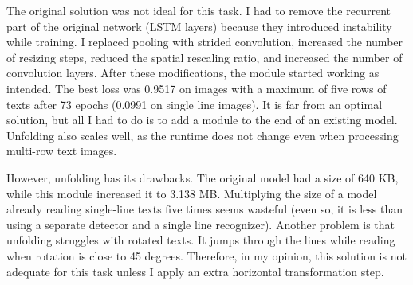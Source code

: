 The original solution was not ideal for this task. I had to remove the recurrent part of the original network (LSTM layers) because they introduced instability while training. I replaced pooling with strided convolution, increased the number of resizing steps, reduced the spatial rescaling ratio, and increased the number of convolution layers. After these modifications, the module started working as intended. The best loss was 0.9517 on images with a maximum of five rows of texts after 73 epochs (0.0991 on single line images). It is far from an optimal solution, but all I had to do is to add a module to the end of an existing model. Unfolding also scales well, as the runtime does not change even when processing multi-row text images.

However, unfolding has its drawbacks. The original model had a size of 640 KB, while this module increased it to 3.138 MB. Multiplying the size of a model already reading single-line texts five times seems wasteful (even so, it is less than using a separate detector and a single line recognizer). Another problem is that unfolding struggles with rotated texts. It jumps through the lines while reading when rotation is close to 45 degrees. Therefore, in my opinion, this solution is not adequate for this task unless I apply an extra horizontal transformation step.
